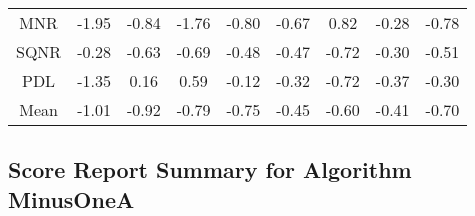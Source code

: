 \begin{longtable}{ | c || c | c | c | c | c | c | c || c |}
MNR &  \cellcolor[HTML]{FFCFCF} -1.95 &  \cellcolor[HTML]{FFE7E7} -0.84 &  \cellcolor[HTML]{FFCFCF} -1.76 &  \cellcolor[HTML]{FFE7E7} -0.80 &  \cellcolor[HTML]{FFEFEF} -0.67 &  \cellcolor[HTML]{E7E7FF} 0.82 &  \cellcolor[HTML]{FFF7F7} -0.28 &  \cellcolor[HTML]{FFEFEF} -0.78 \\
SQNR &  \cellcolor[HTML]{FFF7F7} -0.28 &  \cellcolor[HTML]{FFEFEF} -0.63 &  \cellcolor[HTML]{FFEFEF} -0.69 &  \cellcolor[HTML]{FFEFEF} -0.48 &  \cellcolor[HTML]{FFF7F7} -0.47 &  \cellcolor[HTML]{FFEFEF} -0.72 &  \cellcolor[HTML]{FFF7F7} -0.30 &  \cellcolor[HTML]{FFEFEF} -0.51 \\
PDL &  \cellcolor[HTML]{FFDFDF} -1.35 &  \cellcolor[HTML]{F7F7FF} 0.16 &  \cellcolor[HTML]{EFEFFF} 0.59 &  \cellcolor[HTML]{FFFFFF} -0.12 &  \cellcolor[HTML]{FFF7F7} -0.32 &  \cellcolor[HTML]{FFEFEF} -0.72 &  \cellcolor[HTML]{FFF7F7} -0.37 &  \cellcolor[HTML]{FFF7F7} -0.30 \\
\hline
\hline
Mean  &  \cellcolor[HTML]{FFE7E7} -1.01 &  \cellcolor[HTML]{FFE7E7} -0.92 &  \cellcolor[HTML]{FFEFEF} -0.79 &  \cellcolor[HTML]{FFEFEF} -0.75 &  \cellcolor[HTML]{FFF7F7} -0.45 &  \cellcolor[HTML]{FFEFEF} -0.60 &  \cellcolor[HTML]{FFF7F7} -0.41 &  \cellcolor[HTML]{FFEFEF} -0.70 \\
\hline
\end{longtable}

\subsection*{Score Report Summary for Algorithm MinusOneA}

